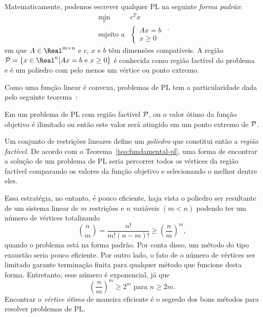     
Matematicamente, podemos escrever qualquer \ac{PL} na seguinte \emph{forma
padrão}:
\begin{equation*}
	\begin{array}{lc}
\displaystyle \min_{x} & c^Tx \\
\text{sujeito a} &\begin{cases} Ax = b \\
				 x \geq 0	
				 \end{cases}
\end{array}.
\label{eq:PL}
\end{equation*}
em que $A\in \Real^{m\times n}$ e $c$, $x$ e $b$ têm dimensões compatíveis. A
região $\Pset = \{x\in\Real^n | Ax=b \text{ e } x\geq 0\}$ é conhecida como
região factível do problema e é um poliedro com pelo menos um vértice ou
ponto extremo.

Como uma função linear é convexa, problemas de \ac{PL} tem a particularidade
dada pelo seguinte
teorema~\cite[cap.~3]{Bazaraa:2009uu}:

\begin{teo} \label{teo:fundamental-pl} Em um
problema de \acl{PL} com região factível $\mathcal{P}$, ou o valor ótimo da função objetivo é  ilimitado ou então este valor
será atingido em um ponto extremo de  $\mathcal{P}$.
\end{teo}


Um conjunto de restrições lineares define um \emph{poliedro} que constitui
então a \emph{região factível}. De acordo com o
Teorema~\ref{teo:fundamental-pl}, uma forma de encontrar a solução de um
problema de \ac{PL} seria percorrer todos os vértices da região factível
comparando os valores da função objetivo e selecionando o melhor dentre eles.

Essa estratégia, no entanto, é pouco eficiente, haja vista o poliedro ser
resultante de um sistema linear de	$m$ restrições e $n$  variáveis $(m<n)$
podendo ter um número de vértices totalizando
\[ 
\binom{n}{m} = \dfrac{n!}{m!(n-m)!} \geq 
\left(\dfrac{n}{m}\right)^m,
\]
quando o problema está na forma padrão. Por conta disso, um método do tipo
exaustão seria pouco eficiente. Por outro lado, o fato de o número de vértices
ser limitado garante terminação finita para qualquer método que funcione desta
forma. Entretanto, esse número é exponencial,
já que 
\[
\left(\dfrac{n}{m}\right)^m \geq 2^m  \text{ para }   n\geq 2m.
\]
Encontrar o \emph{vértice ótimo} de maneira  eficiente é o
segredo dos bons métodos para resolver problemas de \ac{PL}.

